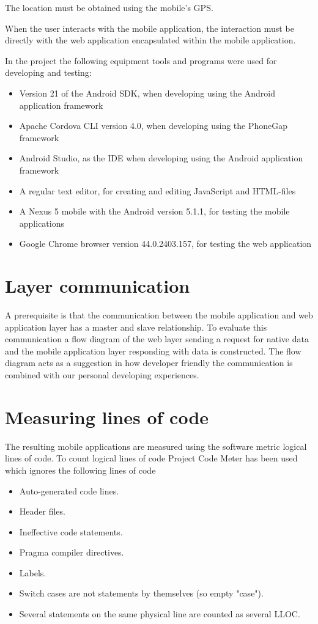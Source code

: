 The location must be obtained using the mobile’s GPS. 

When the user interacts with the mobile application, the interaction must be directly with the web application encapsulated within the mobile application. 

In the project the following equipment tools and programs were used for developing and testing:
\begin{itemize}
\item Version 21 of the Android SDK, when developing using the Android application framework
\item Apache Cordova CLI version 4.0, when developing using the PhoneGap framework
\item Android Studio, as the IDE when developing using the Android application framework
\item A regular text editor, for creating and editing JavaScript and HTML-files
\item A Nexus 5 mobile with the Android version 5.1.1, for testing the mobile applications
\item Google Chrome browser version 44.0.2403.157, for testing the web application
\end{itemize}

\section{Layer communication} \label{sec:layer-communication}
A prerequisite is that the communication between the mobile application and web application layer has a master and slave relationship. To evaluate this communication a flow diagram of the web layer sending a request for native data and the mobile application layer responding with data is constructed. The flow diagram acts as a suggestion in how developer friendly the communication is combined with our personal developing experiences.

\section{Measuring lines of code}\label{sec:measuring-lines-of-code}
The resulting mobile applications are measured using the software metric logical lines of code. To count logical lines of code Project Code Meter has been used which ignores the following lines of code \cite{project-code-meter2015}

\begin{itemize}
\item Auto-generated code lines.
\item Header files.
\item Ineffective code statements.
\item Pragma compiler directives.
\item Labels.
\item Switch cases are not statements by themselves (so empty "case").
\item Several statements on the same physical line are counted as several LLOC.
\end{itemize}

